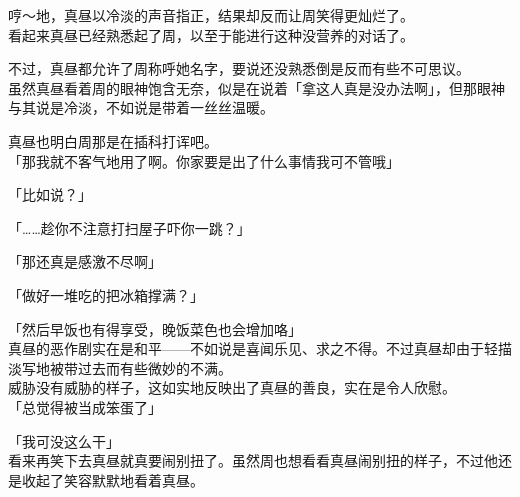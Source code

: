 哼～地，真昼以冷淡的声音指正，结果却反而让周笑得更灿烂了。\\

看起来真昼已经熟悉起了周，以至于能进行这种没营养的对话了。

不过，真昼都允许了周称呼她名字，要说还没熟悉倒是反而有些不可思议。\\

虽然真昼看着周的眼神饱含无奈，似是在说着「拿这人真是没办法啊」，但那眼神与其说是冷淡，不如说是带着一丝丝温暖。

真昼也明白周那是在插科打诨吧。\\

「那我就不客气地用了啊。你家要是出了什么事情我可不管哦」

「比如说？」

「……趁你不注意打扫屋子吓你一跳？」

「那还真是感激不尽啊」

「做好一堆吃的把冰箱撑满？」

「然后早饭也有得享受，晚饭菜色也会增加咯」\\

真昼的恶作剧实在是和平——不如说是喜闻乐见、求之不得。不过真昼却由于轻描淡写地被带过去而有些微妙的不满。\\

威胁没有威胁的样子，这如实地反映出了真昼的善良，实在是令人欣慰。\\

「总觉得被当成笨蛋了」

「我可没这么干」\\

看来再笑下去真昼就真要闹别扭了。虽然周也想看看真昼闹别扭的样子，不过他还是收起了笑容默默地看着真昼。
